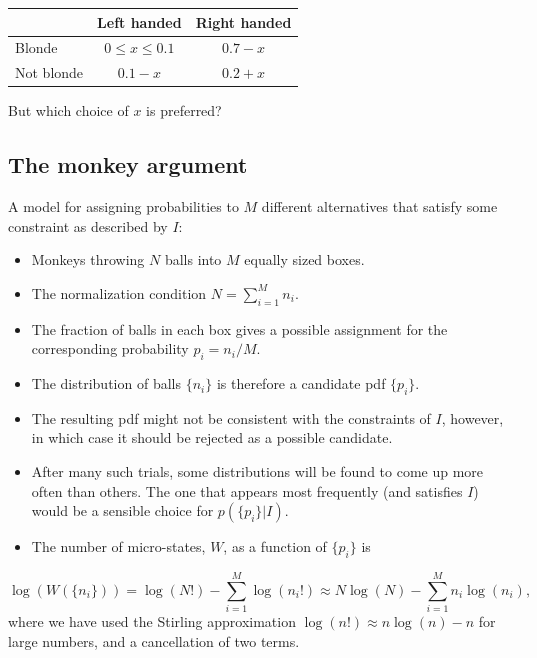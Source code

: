 \documentclass[%
oneside,                 %
final,                   %
10pt]{article}
\begin{document}
\begin{tabular}{lcc}
\hline
\multicolumn{1}{c}{  } & \multicolumn{1}{c}{ Left handed } & \multicolumn{1}{c}{ Right handed } \\
\hline
Blonde     & $0 \le x \le 0.1$ & $0.7-x$      \\
Not blonde & $0.1-x$           & $0.2+x$      \\
\hline
\end{tabular}


\noindent
But which choice of $x$ is preferred?

\subsection{The monkey argument}

A model for assigning probabilities to $M$ different alternatives that satisfy some constraint as described by $I$: 
\begin{itemize}
\item Monkeys throwing $N$ balls into $M$ equally sized boxes.

\item The normalization condition $N = \sum_{i=1}^M n_i$.

\item The fraction of balls in each box gives a possible assignment for the corresponding probability $p_i = n_i / M$.

\item The distribution of balls $\{ n_i \}$ is therefore a candidate pdf $\{ p_i \}$.

\item The resulting pdf might not be consistent with the constraints of $I$, however, in which case it should be rejected as a possible candidate.

\item After many such trials, some distributions will be found to come up more often than others. The one that appears most frequently (and satisfies $I$) would be a sensible choice for $p(\{p_i\}|I)$.
\end{itemize}

\noindent
\begin{itemize}
\item The number of micro-states, $W$, as a function of $\{p_i\}$ is
\end{itemize}

\noindent
\[
\log(W(\{n_i\})) = \log(N!) − \sum_{i=1}^M \log(n_i!) 
\approx N\log(N) - \sum_{i=1}^M n_i\log(n_i),
\]
  where we have used the Stirling approximation $\log(n!) \approx n\log(n) - n$ for large numbers, and a cancellation of two terms. 
\end{document}
